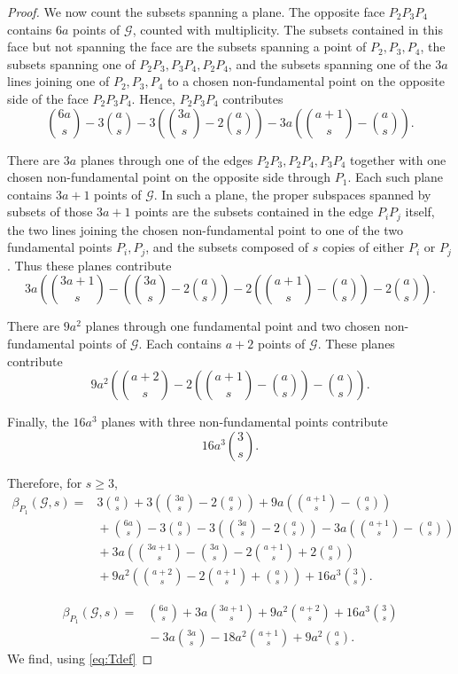 \documentclass[10pt,a4paper]{amsart}
\newcommand{\Gscr}{\mathscr{G}}
\begin{document}
\begin{proof}
We now count the subsets spanning a plane. The opposite face $P_2P_3P_4$
contains $6a$ points of $\Gscr$, counted with multiplicity. The subsets
contained in this face but not spanning the face are the subsets spanning a point of
 $P_2,P_3,P_4$, the subsets spanning one of $P_2P_3,P_3P_4,P_2P_4$,
and the subsets spanning one of the $3a$ lines joining one of $P_2,P_3,P_4$ to a chosen
non-fundamental point on the opposite side of the face $P_2P_3P_4$. Hence, $P_2P_3P_4$
contributes
\[
\binom{6a}{s}
-3\binom{a}{s}
-3\left(\binom{3a}{s}-2\binom{a}{s}\right)
-3a\left(\binom{a+1}{s}-\binom{a}{s}\right).
\]

There are $3a$ planes through one of the edges
$P_2P_3,P_2P_4,P_3P_4$ together with one chosen non-fundamental point on the
opposite side through $P_1$. Each such plane contains $3a+1$ points of
$\Gscr$. In such a plane, the proper subspaces spanned by subsets of those $3a+1$ points are the subsets contained in the edge $P_iP_j$ itself, the two lines joining the chosen non-fundamental point to one of the two fundamental points $P_i,P_j$, and the subsets composed of $s$ copies of either $P_i$ or $P_j$. Thus these planes contribute
\[
3a\left(
\binom{3a+1}{s}
-\left(\binom{3a}{s}-2\binom{a}{s}\right)
-2\left(\binom{a+1}{s}-\binom{a}{s}\right)-2\binom{a}{s}
\right).
\]


There are $9a^2$ planes through one fundamental point and two chosen
non-fundamental points of $\Gscr$. Each contains $a+2$ points of $\Gscr$.
These
planes contribute
\[
9a^2\left(
\binom{a+2}{s}
-2\left(\binom{a+1}{s}-\binom{a}{s}\right)-\binom{a}{s}
\right).
\]


Finally, the $16a^3$ planes with three non-fundamental points contribute
\[
16a^3\binom{3}{s}.
\]

Therefore, for $s\geq 3$,
\[
\begin{aligned}
\beta_{P_1}(\Gscr,s)
={}&
3\binom{a}{s}
+3\left(\binom{3a}{s}-2\binom{a}{s}\right)
+9a\left(\binom{a+1}{s}-\binom{a}{s}\right)\\
&{}+\binom{6a}{s}
-3\binom{a}{s}
-3\left(\binom{3a}{s}-2\binom{a}{s}\right)
-3a\left(\binom{a+1}{s}-\binom{a}{s}\right)\\
&{}+3a\left(
\binom{3a+1}{s}
-\binom{3a}{s}
-2\binom{a+1}{s}
+2\binom{a}{s}
\right)\\
&{}+9a^2\left(
\binom{a+2}{s}
-2\binom{a+1}{s}
+\binom{a}{s}
\right)
+16a^3\binom{3}{s}.
\end{aligned}
\]


\[
\begin{aligned}
\beta_{P_1}(\Gscr,s)
={}&
\binom{6a}{s}
+3a\binom{3a+1}{s}
+9a^2\binom{a+2}{s}
+16a^3\binom{3}{s}\\
&{}-3a\binom{3a}{s}
-18a^2\binom{a+1}{s}
+9a^2\binom{a}{s}.
\end{aligned}
\]
We find, using \eqref{eq:Tdef}


\end{proof}
\end{document}
